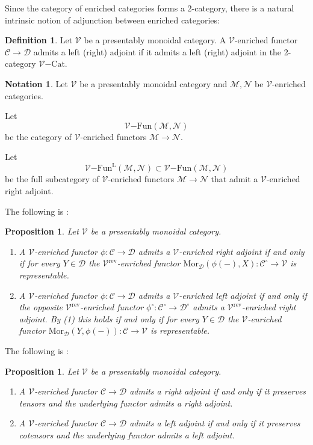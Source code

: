 \documentclass[10pt,oneside]{article}
\numberwithin{equation}{section} %
\numberwithin{figure}{section} %
\theoremstyle{plain}
\newtheorem{proposition}[theorem]{Proposition}
\theoremstyle{definition}
\newtheorem{definition}[theorem]{Definition}
\newtheorem{notation}[theorem]{Notation}
\newcommand{\mC}{{\mathcal C}}
\newcommand{\mD}{{\mathcal D}}
\newcommand{\mM}{{\mathcal M}}
\newcommand{\mN}{{\mathcal N}}
\newcommand{\mV}{{\mathcal V}}
\renewcommand{\L}{{\mathrm L}}
\newcommand{\X}{X}
\newcommand{\Y}{Y}
\newcommand{\rev}{{\mathrm{rev}}}
\newcommand{\Cat}{\mathrm{Cat}}
\newcommand{\Fun}{\mathrm{Fun}}
\newcommand{\Mor}{{\mathrm{Mor}}}
\begin{document}
Since the category of enriched categories forms a 2-category, there is a natural intrinsic notion of adjunction between enriched categories:

\begin{definition}Let $\mV$ be a presentably monoidal category.
A $\mV$-enriched functor $\mC \to \mD$ admits a left (right) adjoint if
it admits a left (right) adjoint in the 2-category $\mV \mathrm{-}\Cat.$

\end{definition}

\begin{notation}Let $\mV$ be a presentably monoidal category and $\mM, \mN$ be $\mV$-enriched categories.

Let $$\mV\mathrm{-}\Fun(\mM,\mN)$$ be the category of $\mV$-enriched functors
$\mM \to \mN.$

Let $$\mV\mathrm{-}\Fun^\L(\mM,\mN) \subset {\mV\mathrm{-}\Fun(\mM,\mN)}$$ be the full subcategory of $\mV$-enriched functors
$\mM \to \mN$ that admit a $\mV$-enriched right adjoint.
    
\end{notation}

The following is \cite[Remark 2.75.]{heine2024bienriched}:

\begin{proposition}
Let $\mV$ be a presentably monoidal category.
\begin{enumerate}[\normalfont(1)]\setlength{\itemsep}{-2pt}
\item A $\mV$-enriched functor $\phi: \mC \to \mD$ admits a $\mV$-enriched right adjoint if and only if for every $\Y \in \mD$ the $\mV^\rev$-enriched functor
$\Mor_\mD(\phi(-),\X): \mC^\circ \to \mV$ is representable.
\item A $\mV$-enriched functor $\phi: \mC \to \mD$ admits a $\mV$-enriched left adjoint if and only if the opposite $\mV^\rev$-enriched functor $\phi^\circ: \mC^\circ \to \mD^\circ$ admits a $\mV^\rev$-enriched right adjoint. By (1) this holds if and only if for every $\Y \in \mD$ the $\mV$-enriched functor
$\Mor_\mD(\Y,\phi(-)): \mC \to \mV$ is representable.
\end{enumerate}
\end{proposition}

The following is \cite[Lemma 2.77.]{heine2024bienriched}:

\begin{proposition}\label{adj}
Let $\mV$ be a presentably monoidal category.
\begin{enumerate}[\normalfont(1)]\setlength{\itemsep}{-2pt}
\item A $\mV$-enriched functor $\mC \to \mD$ admits a right adjoint if and only if it preserves tensors and the underlying functor admits a right adjoint.
\item A $\mV$-enriched functor $\mC \to \mD$ admits a left adjoint if and only if it preserves cotensors and the underlying functor admits a left adjoint.
\end{enumerate}

\end{proposition}
\end{document}
